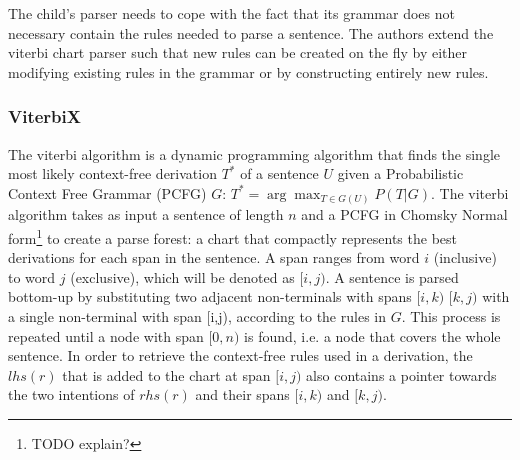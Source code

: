 \documentclass[a4paper]{article}
\begin{document}
The child's parser needs to cope with the fact that its grammar does not necessary contain the rules needed to parse a sentence. The authors extend the viterbi chart parser such that new rules can be created on the fly by either modifying existing rules in the grammar or by constructing entirely new rules. 

\subsubsection{ViterbiX} %
The viterbi algorithm is a dynamic programming algorithm that finds the single most likely context-free derivation $T^*$ of a sentence $U$ given a Probabilistic Context Free Grammar (PCFG) $G$: $T^* = \arg \max_{T \in G(U)} P(T|G)$. The viterbi algorithm takes as input a sentence of length $n$ and a PCFG in Chomsky Normal form\footnote{TODO explain?} to create a parse forest: a chart that compactly represents the best derivations for each span in the sentence. A span ranges from word $i$ (inclusive) to word $j$ (exclusive), which will be denoted as $[i,j)$. A sentence is parsed bottom-up by substituting two adjacent non-terminals with spans $[i,k)$ $[k,j)$ with a single non-terminal with span [i,j), according to the rules in $G$. This process is repeated until a node with span $[0,n)$ is found, i.e. a node that covers the whole sentence. In order to retrieve the context-free rules used in a derivation, the $lhs(r)$ that is added to the chart at span $[i,j)$ also contains a pointer towards the two intentions of $rhs(r)$ and their spans $[i,k)$ and $[k,j)$.
\end{document}
